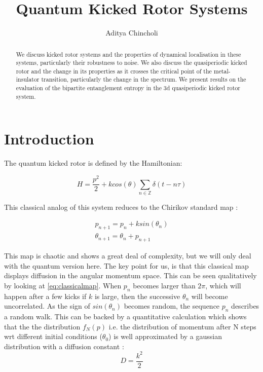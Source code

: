 \documentclass[twocolumn]{report}
\title{Quantum Kicked Rotor Systems}
\author{Aditya Chincholi}
\begin{document}
\maketitle

\onecolumn
\begin{abstract}
    We discuss kicked rotor systems and the properties of dynamical
    localisation in these systems, particularly their robustness to
    noise. We also discuss the quasiperiodic kicked rotor and the
    change in its properties as it crosses the critical point of the
    metal-insulator transition, particularly the change in the spectrum.
    We present results on the evaluation of the bipartite entanglement
    entropy in the 3d quasiperiodic kicked rotor system.
\end{abstract}

\tableofcontents


\twocolumn
\chapter{Introduction}
The quantum kicked rotor is defined by the Hamiltonian:

\begin{equation}
H = \frac{p^2}{2} + k cos(\theta) \sum_{n \in \mathbb{Z}} \delta(t - n\tau)
\end{equation}

This classical analog of this system reduces to the Chirikov standard map
\cite{stockmann}:

\begin{align}
    p_{n+1} = p_n + k sin(\theta_n) \\
    \theta_{n+1} = \theta_n + p_{n+1} \label{eq:classicalmap}
\end{align}

This map is chaotic and shows a great deal of complexity, but we will only
deal with the quantum version here. The key point for us, is that this
classical map displays diffusion in the angular momentum space. This can be
seen qualitatively by looking at \ref{eq:classicalmap}. When $p_n$ becomes
larger than $2\pi$, which will happen after a few kicks if $k$ is large,
then the successive $\theta_n$ will become uncorrelated. As the sign of
$sin(\theta_n)$ becomes random, the sequence ${p_n}$ describes a random walk.
This can be backed by a quantitative calculation which shows that the
the distribution $f_N(p)$ i.e. the distribution of momentum after N steps
wrt different initial conditions ($\theta_0$) is well approximated by a
gaussian distribution with a diffusion constant \cite{stockmann}:
\begin{equation}
    D = \frac{k^2}{2}
\end{equation}
\end{document}
